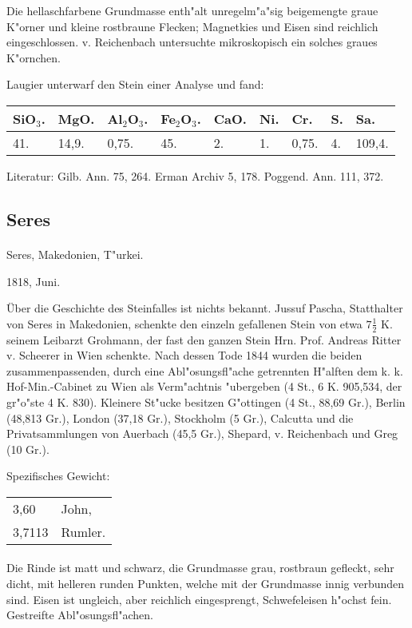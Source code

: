 \documentclass[a4paper, 11pt, oneside]{article}
\begin{document}
Die hellaschfarbene Grundmasse enth"alt unregelm"a"sig beigemengte graue K"orner und kleine rostbraune Flecken; Magnetkies und Eisen sind reichlich eingeschlossen. v. Reichenbach untersuchte mikroskopisch ein solches graues K"ornchen.

Laugier unterwarf den Stein einer Analyse und fand:
\begin{table}[!ht]
    \centering
    \begin{tabular}{l l l l l l l l l}
        SiO$_{3}$. & MgO. & Al$_{2}$O$_{3}$. & Fe$_{2}$O$_{3}$. & CaO. & Ni. & Cr. & S. & Sa. \\ \hline
        41. & 14,9. & 0,75. & 45. & 2. & 1. & 0,75. & 4. & 109,4. \\
    \end{tabular}
\end{table}

\footnotesize
Literatur: Gilb. Ann. 75, 264. Erman Archiv 5, 178. Poggend. Ann. 111, 372.
\subsection{Seres}
\normalsize
\paragraph{}
Seres, Makedonien, T"urkei.

1818, Juni.

Über die Geschichte des Steinfalles ist nichts bekannt. Jussuf Pascha, Statthalter von Seres in Makedonien, schenkte den einzeln gefallenen Stein von etwa $7\frac{1}{2}$ K. seinem Leibarzt Grohmann, der fast den ganzen Stein Hrn. Prof. Andreas Ritter v. Scheerer in Wien schenkte. Nach dessen Tode 1844 wurden die beiden zusammenpassenden, durch eine Abl"osungsfl"ache getrennten H"alften dem k. k. Hof-Min.-Cabinet zu Wien als Verm"achtnis "ubergeben (4 St., 6 K. 905,534, der gr"o"ste 4 K. 830). Kleinere St"ucke besitzen G"ottingen (4 St., 88,69 Gr.), Berlin (48,813 Gr.), London (37,18 Gr.), Stockholm (5 Gr.), Calcutta und die Privatsammlungen von Auerbach (45,5 Gr.), Shepard, v. Reichenbach und Greg (10 Gr.).

Spezifisches Gewicht:
\begin{table}[!ht]
    \centering
    \begin{tabular}{l l}
        3,60 & John,\\
        3,7113 & Rumler.
    \end{tabular}
\end{table}
\paragraph{}
Die Rinde ist matt und schwarz, die Grundmasse grau, rostbraun gefleckt, sehr dicht, mit helleren runden Punkten, welche mit der Grundmasse innig verbunden sind. Eisen ist ungleich, aber reichlich eingesprengt, Schwefeleisen h"ochst fein. Gestreifte Abl"osungsfl"achen.
\end{document}
